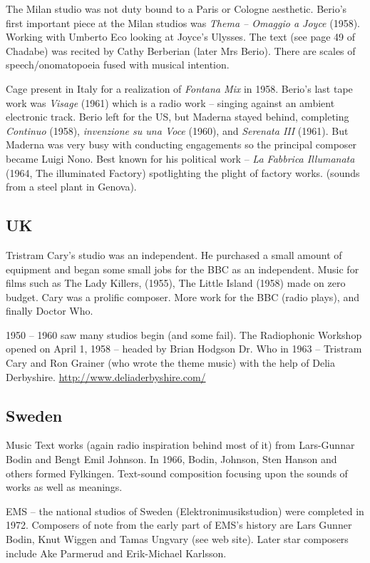 The Milan studio was not duty bound to a Paris or Cologne aesthetic.  Berio's first important piece at the Milan studios was \textit{Thema – Omaggio a Joyce} (1958).  Working with Umberto Eco looking at Joyce's Ulysses. The text (see page 49 of Chadabe) was recited by Cathy Berberian (later Mrs Berio). There are scales of speech/onomatopoeia fused with musical intention.

Cage present in Italy for a realization of \textit{Fontana Mix} in 1958.  Berio's last tape work was \textit{Visage} (1961) which is a radio work – singing against an ambient electronic track.  Berio left for the US, but Maderna stayed behind, completing \textit{Continuo} (1958), \textit{invenzione su una Voce} (1960), and \textit{Serenata III} (1961).  But Maderna was very busy with conducting engagements so the principal composer became Luigi Nono. Best known for his political work – \textit{La Fabbrica Illumanata} (1964, The illuminated Factory) spotlighting the plight of factory works. (sounds from a steel plant in Genova).

\subsection{UK}
Tristram Cary's studio was an independent. He purchased a small amount of equipment and began some small jobs for the BBC as an independent.  Music for films such as The Lady Killers, (1955), The Little Island (1958) made on zero budget.  Cary was a prolific composer.  More work for the BBC (radio plays), and finally Doctor Who. 

1950 – 1960 saw many studios begin (and some fail). The Radiophonic Workshop opened on April 1, 1958 – headed by Brian Hodgson
Dr. Who in 1963 – Tristram Cary and Ron Grainer (who wrote the theme music) with the help of Delia Derbyshire. \url{http://www.deliaderbyshire.com/}

\subsection{Sweden}
Music Text works (again radio inspiration behind most of it) from Lars-Gunnar Bodin and Bengt Emil Johnson.  In 1966, Bodin, Johnson, Sten Hanson and others formed Fylkingen.  Text-sound composition focusing upon the sounds of works as well as meanings.  

EMS – the national studios of Sweden (Elektronimusikstudion) were completed in 1972.  Composers of note from the early part of EMS's history are Lars Gunner Bodin, Knut Wiggen and Tamas Ungvary (see web site). Later star composers include Ake Parmerud and Erik-Michael Karlsson. 


